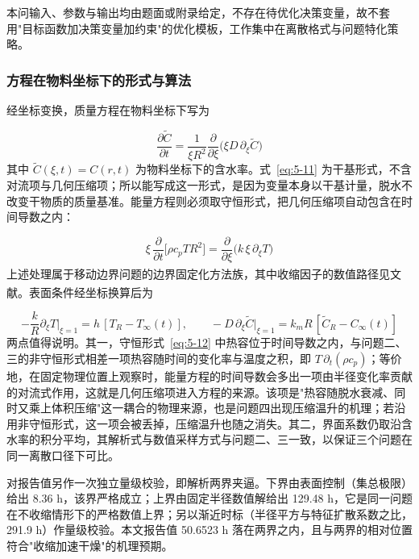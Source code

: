 本问输入、参数与输出均由题面或附录给定，不存在待优化决策变量，故不套用"目标函数加决策变量加约束"的优化模板，工作集中在离散格式与问题特化策略。

\subsubsection{方程在物料坐标下的形式与算法}
经坐标变换，质量方程在物料坐标下写为

\begin{equation}
  \frac{\partial \tilde C}{\partial t}=\frac{1}{\xi R^2}\frac{\partial}{\partial\xi}\Big(\xi D\,\partial_\xi \tilde C\Big)
  \label{eq:5-11}
\end{equation}
其中 $\tilde C(\xi,t)=C(r,t)$ 为物料坐标下的含水率。式~\eqref{eq:5-11} 为干基形式，不含对流项与几何压缩项；所以能写成这一形式，是因为变量本身以干基计量，脱水不改变干物质的质量基准。能量方程则必须取守恒形式，把几何压缩项自动包含在时间导数之内：

\begin{equation}
  \xi\,\frac{\partial}{\partial t}\Big[\rho c_p T R^2\Big]=\frac{\partial}{\partial\xi}\Big(k\,\xi\,\partial_\xi T\Big)
  \label{eq:5-12}
\end{equation}
上述处理属于移动边界问题的边界固定化方法族\textsuperscript{\cite{ref12,ref15,ref16,ref17,ref18}}，其中收缩因子的数值路径见文献\textsuperscript{\cite{ref13}}。表面条件经坐标换算后为

\begin{equation}
  -\frac{k}{R}\partial_\xi T\big|_{\xi=1}=h\,[T_R-T_\infty(t)],\qquad -D\,\partial_\xi \tilde C\big|_{\xi=1}=k_m R\,[\tilde C_R-C_\infty(t)]
  \label{eq:5-13}
\end{equation}
两点值得说明。其一，守恒形式~\eqref{eq:5-12} 中热容位于时间导数之内，与问题二、三的非守恒形式相差一项热容随时间的变化率与温度之积，即 $T\,\partial_t(\rho c_p)$；等价地，在固定物理位置上观察时，能量方程的时间导数会多出一项由半径变化率贡献的对流式作用，这就是几何压缩项进入方程的来源。该项是"热容随脱水衰减、同时又乘上体积压缩"这一耦合的物理来源，也是问题四出现压缩温升的机理；若沿用非守恒形式，这一项会被丢掉，压缩温升也随之消失。其二，界面系数仍取沿含水率的积分平均，其解析式与数值采样方式与问题二、三一致，以保证三个问题在同一离散口径下可比。

对报告值另作一次独立量级校验，即解析两界夹逼。下界由表面控制（集总极限）给出 8.36 h，该界严格成立；上界由固定半径数值解给出 129.48 h，它是同一问题在不收缩情形下的严格数值上界；另以渐近时标（半径平方与特征扩散系数之比，291.9 h）作量级校验。本文报告值 50.6523 h 落在两界之内，且与两界的相对位置符合"收缩加速干燥"的机理预期。


